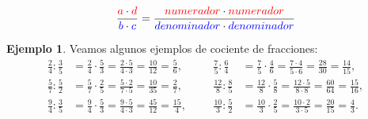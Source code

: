 \documentclass[12pt]{examdesign}
\theoremstyle{plain}
\theoremstyle{definition}
\newtheorem{exa}[theorem]{Ejemplo}
\theoremstyle{remark}
\begin{document}
\begin{endmatter}
\begin{tcolorbox}[colback=red!10!white, colframe=tealgreen, title=\textbf{Cociente de Fracciones:}]
\begin{align*}
				\frac{\textcolor{red}{a}\cdot \textcolor{red}{d}}{\textcolor{blue}{b}\cdot \textcolor{blue}{c}}=\frac{\textcolor{red}{numerador}\cdot \textcolor{red}{numerador}}{\textcolor{blue}{denominador}\cdot \textcolor{blue}{denominador}}
				\end{align*}
			\end{tcolorbox}
			\vspace{.1cm}
			\begin{exa}
				Veamos algunos ejemplos de cociente de fracciones:
				\begin{align*}
				\frac{2}{4}:\frac{3}{5}  &= \frac{2}{4}\cdot\frac{5}{3} = \frac{2\cdot 5}{4\cdot 3} = \frac{10}{12} = \frac{5}{6}, &&&
				\frac{7}{5}:\frac{6}{4}  &= \frac{7}{5}\cdot\frac{4}{6} = \frac{7\cdot 4}{5\cdot 6} = \frac{28}{30} = \frac{14}{15},
				\\[0.2cm]
				\frac{5}{7}:\frac{5}{2}  &= \frac{5}{7}\cdot\frac{2}{5} = \frac{5\cdot 2}{7\cdot 5} = \frac{10}{35} = \frac{2}{7}, &&&
				\frac{12}{8}:\frac{8}{5} &= \frac{12}{8}\cdot\frac{5}{8}= \frac{12\cdot 5}{8\cdot 8}= \frac{60}{64} = \frac{15}{16},
				\\[0.2cm]
				\frac{9}{4}:\frac{3}{5}  &= \frac{9}{4}\cdot\frac{5}{3} = \frac{9\cdot 5}{4\cdot 3} = \frac{45}{12}=\frac{15}{4}, &&&
				\frac{10}{3}:\frac{5}{2} &= \frac{10}{3}\cdot\frac{2}{5}= \frac{10\cdot 2}{3\cdot 5}= \frac{20}{15}=\frac{4}{3}.
				\end{align*}
			\end{exa}
			
		\end{endmatter}
\end{document}
